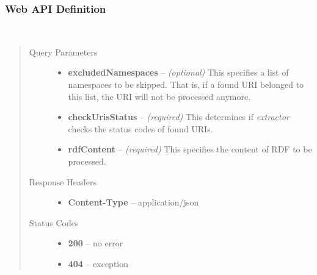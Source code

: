 \documentclass[letterpaper,10pt,english]{sphinxmanual}
\begin{document}
\subsubsection{Web API Definition}
\label{docs/extractor:web-api-definition}

\begin{fulllineitems}
\label{docs/extractor:post--extractor_?excludedNamespaces, checkUrisStatus, rdfContent_}~\begin{quote}\begin{description}
\item[{Query Parameters}] \leavevmode\begin{itemize}
\item {} 
\textbf{excludedNamespaces} -- \emph{(optional)} This specifies a list of namespaces to be skipped. That is, if a found URI belonged to this list, the URI will not be processed anymore.

\item {} 
\textbf{checkUrisStatus} -- \emph{(required)} This determines if \emph{extractor} checks the status codes of found URIs.

\item {} 
\textbf{rdfContent} -- \emph{(required)} This specifies the content of RDF to be processed.

\end{itemize}

\item[{Response Headers}] \leavevmode\begin{itemize}
\item {} 
\textbf{Content-Type} -- application/json

\end{itemize}

\item[{Status Codes}] \leavevmode\begin{itemize}
\item {} 
\textbf{200} -- no error

\item {} 
\textbf{404} -- exception

\end{itemize}

\end{description}\end{quote}

\end{fulllineitems}
\end{document}

